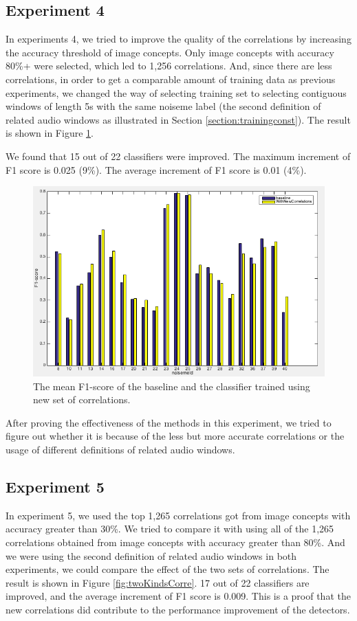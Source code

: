 \documentclass[conference, 11pt, onecolumn]{IEEEtran}
\begin{document}
\subsection{Experiment 4}
In experiments 4, we tried to improve the quality of the correlations by increasing the accuracy threshold of image concepts.
Only image concepts with accuracy 80\%+ were selected, which led to 1,256 correlations. And, since there are less correlations, in order to get a comparable amount of training data as previous experiments, we changed the way of selecting training set to selecting contiguous windows of length 5s with the same noiseme label (the second definition of related audio windows as illustrated in Section \ref{section:trainingconst}).
The result is shown in Figure \ref{fig:newCombined}. 

We found that 15 out of 22 classifiers were improved. The maximum increment of F1 score is 0.025 (9\%). The average increment of F1 score is 0.01 (4\%).

\begin{figure}[h!]
\centering
\includegraphics[scale=0.45]{figure/newCombined.png}
\caption{The mean F1-score of the baseline and the classifier trained using new set of correlations.}
\label{fig:newCombined}
\end{figure}

After proving the effectiveness of the methods in this experiment, we tried to figure out whether it is because of the less but more accurate correlations or the usage of different definitions of related audio windows.

\subsection{Experiment 5}
In experiment 5, we used the top 1,265 correlations got from image concepts with accuracy greater than 30\%. We tried to compare it with using all of the 1,265 correlations obtained from image concepts with accuracy greater than 80\%. And we were using the second definition of related audio windows in both experiments, we could compare the effect of the two sets of correlations.
The result is shown in Figure \ref{fig:twoKindsCorre}.
17 out of 22 classifiers are improved, and the average increment of F1 score is 0.009. This is a proof that the new correlations did contribute to the performance improvement of the detectors.
\end{document}
